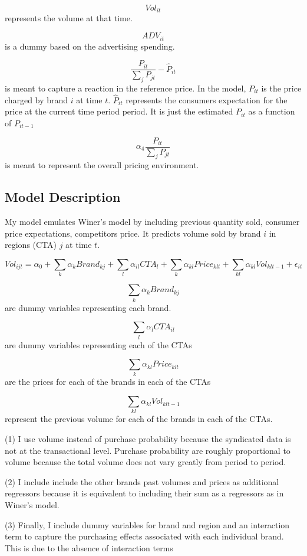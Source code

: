 \documentclass{article}
\begin{document}
$$Vol_{it}$$ represents the volume at that time.

$$ADV_{it}$$ is a dummy based on the advertising spending.

$$\dfrac{P_{it}} {\sum_j P_{jt}} - \hat{P}_{it}$$ is meant to capture a reaction in the reference price.  In the model, $P_{it}$ is the price charged by brand $i$ at time $t$. $\hat{P}_{it}$ represents the consumers expectation for the price at the current time period period. It is just the estimated ${P}_{it}$ as a function of ${P}_{it-1}$ 

$$ \alpha_4 \dfrac {P_{it}}{\sum_j P_{jt}}$$ is meant to represent the overall pricing environment.

\subsection{Model Description}

My model emulates Winer's model by including previous quantity sold, consumer price expectations, competitors price. It predicts volume sold by brand $i$ in regions (CTA) $j$ at time $t$.

$$Vol_{ijt} = \alpha_0 + \sum_{k} \alpha_{k} Brand_{kj} + \sum_{l} \alpha_{il} CTA_{l} + \sum_{k} \alpha_{kl} Price_{klt} + \sum_{kl} \alpha_{kl} Vol_{klt-1} + \epsilon_{it}$$

$$\sum_{k} \alpha_{k} Brand_{kj}$$ are dummy variables representing each brand.

$$\sum_{l} \alpha_{l} CTA_{il}$$ are dummy variables representing each of the CTAs

$$\sum_{k} \alpha_{kl} Price_{klt}$$ are the prices for each of the brands in each of the CTAs

$$\sum_{kl} \alpha_{kl} Vol_{klt-1}$$ represent the previous volume for each of the brands in each of the CTAs.

(1) I use volume instead of purchase probability because the syndicated data is not at the transactional level. Purchase probability are roughly proportional to volume because the total volume does not vary greatly from period to period. 

(2) I include include the other brands past volumes and prices as additional regressors because it is equivalent to including their sum as a regressors as in Winer's model. 

(3) Finally, I include dummy variables for brand and region and an interaction term to capture the purchasing effects associated with each individual brand. This is due to the absence of interaction terms
\end{document}
